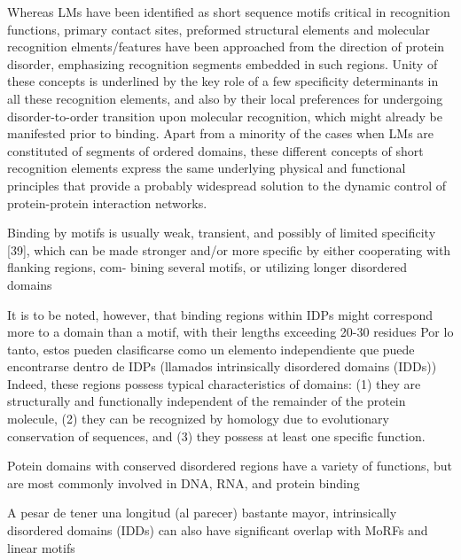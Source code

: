 Whereas LMs have been identified as short sequence motifs critical in recognition functions, primary contact sites, preformed structural elements and molecular recognition elments/features have been approached from the direction of protein disorder, emphasizing recognition segments embedded in such regions. Unity of these concepts is underlined by the key role of a few specificity determinants in all these recognition elements, and also by their local preferences for undergoing disorder-to-order transition upon molecular recognition, which might already
be manifested prior to binding. 
Apart from a minority of the cases when LMs are constituted of segments of ordered domains, these different concepts of short recognition elements express the same underlying physical and
functional principles that provide a probably widespread solution to the dynamic control of protein-protein interaction networks.





Binding by motifs is usually weak, transient, and possibly of limited
specificity [39], which can be made stronger and/or more
specific by either cooperating with flanking regions, com-
bining several motifs, or utilizing longer disordered
domains

It is to be noted, however, that binding regions within IDPs
might correspond more to a domain than a motif, with their
lengths exceeding 20-30 residues \cite{tompa2009close,chen2006conservation,chen2006conservationB}  
Por lo tanto, estos pueden clasificarse como un elemento independiente que puede encontrarse dentro de IDPs (llamados intrinsically disordered domains (IDDs))
Indeed, these regions
possess typical characteristics of domains: (1) they are
structurally and functionally independent of the remainder of
the protein molecule, (2) they can be recognized by homology
due to evolutionary conservation of sequences, and (3)
they possess at least one specific function.

Potein domains with
conserved disordered regions have a variety of functions, but are
most commonly involved in DNA, RNA, and protein binding

A pesar de tener una longitud (al parecer) bastante mayor,
intrinsically disordered domains (IDDs) can also have significant
overlap with MoRFs and linear motifs







